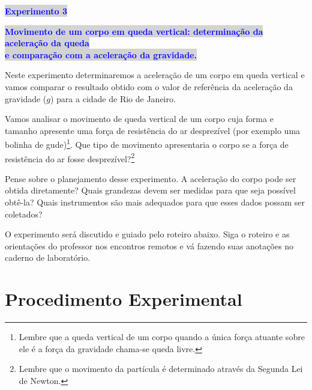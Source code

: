 \documentclass[12pt]{article}
\begin{document}
{\centerline {\large {\colorbox{lightgray}{{\textcolor {blue} {\bf Experimento 3}}} }}

\vskip 0.3cm 

\large{ {\colorbox{lightgray}{{\textcolor {blue} {\bf Movimento de um corpo em queda vertical: determinação da aceleração da queda }}} \\
\hskip 0.5cm \large{ {\colorbox{lightgray}{{\textcolor {blue} {\bf e comparação com a aceleração da gravidade.}}} }}}}}

\indent

Neste experimento determinaremos a aceleração de um corpo em queda vertical e vamos 
comparar o resultado obtido com o valor de referência da aceleração da gravidade ($g$)
para a cidade de Rio de Janeiro. 
\par
Vamos analisar o movimento de queda vertical de um corpo cuja forma e tamanho apresente uma força de resistência do ar desprezível (por exemplo uma bolinha de gude)\footnote{Lembre que a queda vertical de um corpo quando a única força atuante sobre ele é a força da gravidade chama-se queda livre.}. Que tipo de movimento 
apresentaria o corpo se a força de resistência do ar fosse desprezível?\footnote{Lembre que o movimento da partícula é determinado através da Segunda Lei de Newton.}
\par 
Pense sobre o planejamento desse experimento. A aceleração do corpo pode ser obtida diretamente? Quais grandezas devem ser medidas para que seja possível obtê-la? Quais instrumentos são mais adequados para que esses dados possam ser coletados?
\par 
O experimento será discutido e guiado pelo roteiro abaixo. Siga o roteiro e as orientações do professor 
nos encontros remotos e vá fazendo suas anotações no caderno de laboratório. 

\section{Procedimento Experimental}
\end{document}
